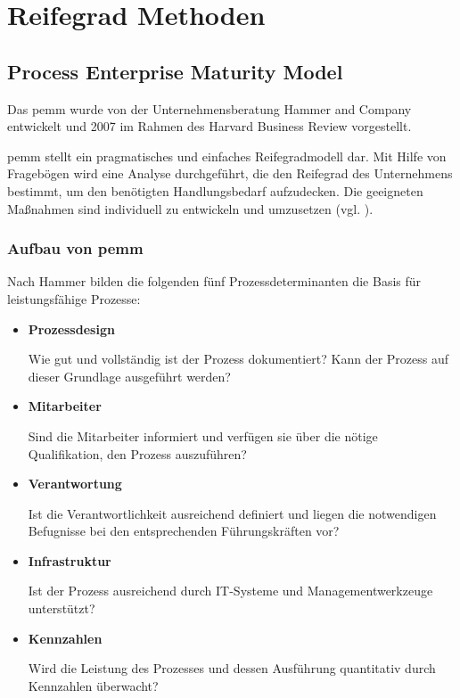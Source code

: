 \newpage
\section{Reifegrad Methoden}

\subsection{Process Enterprise Maturity Model}

Das \ac{pemm} wurde von der Unternehmensberatung Hammer and Company entwickelt und 2007 im Rahmen des Harvard Business Review vorgestellt.\par
\acs{pemm} stellt ein pragmatisches und einfaches Reifegradmodell dar. Mit Hilfe von Fragebögen wird eine Analyse durchgeführt, die den Reifegrad des Unternehmens bestimmt, um den benötigten Handlungsbedarf aufzudecken. Die geeigneten Maßnahmen sind individuell zu entwickeln und umzusetzen (vgl. \cite[S.41]{Bensiek2013}).

\subsubsection{Aufbau von \acs{pemm}}

Nach Hammer bilden die folgenden fünf Prozessdeterminanten die Basis für leistungsfähige Prozesse:

\begin{itemize}
  \item \textbf{Prozessdesign} \par Wie gut und vollständig ist der Prozess dokumentiert? Kann der Prozess auf dieser Grundlage ausgeführt werden?
	\item \textbf{Mitarbeiter} \par Sind die Mitarbeiter informiert und verfügen sie über die nötige Qualifikation, den Prozess auszuführen?
	\item \textbf{Verantwortung} \par Ist die Verantwortlichkeit ausreichend definiert und liegen die notwendigen Befugnisse bei den entsprechenden Führungskräften vor?
	\item \textbf{Infrastruktur} \par Ist der Prozess ausreichend durch IT-Systeme und Managementwerkzeuge unterstützt?
	\item \textbf{Kennzahlen} \par Wird die Leistung des Prozesses und dessen Ausführung quantitativ durch Kennzahlen überwacht?
\end{itemize}

